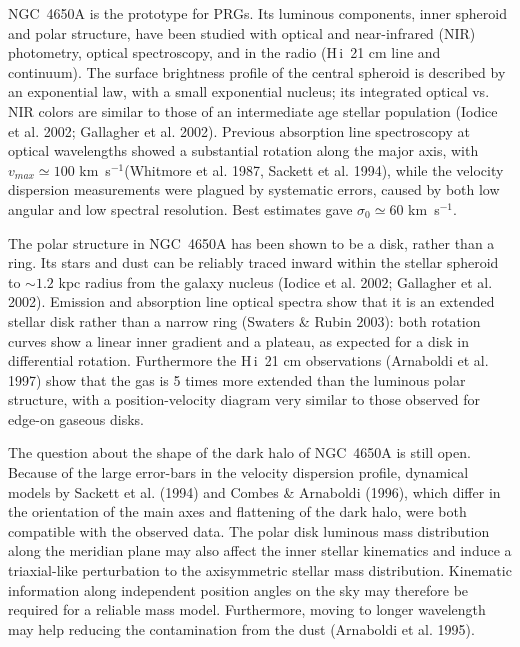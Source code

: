 \documentclass[12pt,preprint]{aastex}
\newcommand{\HI}{\mbox{H\,{\sc i}}}
\newcommand{\kms}{\mbox{km~s$^{-1}$}}
\begin{document}
NGC~4650A is the prototype for PRGs. Its luminous components, inner
spheroid and polar structure, have been studied with optical and
near-infrared (NIR) photometry, optical spectroscopy, and in the radio
(\HI\ 21 cm line and continuum).  The surface brightness profile of
the central spheroid is described by an exponential law, with a small
exponential nucleus; its integrated optical vs. NIR colors are similar
to those of an intermediate age stellar population (Iodice et
al. 2002; Gallagher et al. 2002). Previous absorption line spectroscopy
at optical wavelengths showed a substantial rotation along the major
axis, with $v_{max} \simeq 100$ \kms (Whitmore et al. 1987, Sackett et
al. 1994), while the velocity dispersion measurements were plagued by
systematic errors, caused by both low angular and low spectral
resolution. Best estimates gave $\sigma_0 \simeq 60$ \kms.

The polar structure in NGC~4650A has been shown to be a disk, rather
than a ring. Its stars and dust can be reliably traced inward within
the stellar spheroid to $\sim 1.2$ kpc radius from the galaxy nucleus
(Iodice et al. 2002; Gallagher et al. 2002). Emission and absorption
line optical spectra show that it is an extended stellar disk rather
than a narrow ring (Swaters \& Rubin 2003): both rotation curves show
a linear inner gradient and a plateau, as expected for a disk in
differential rotation. Furthermore the \HI\ 21 cm observations
(Arnaboldi et al. 1997) show that the gas is 5 times more extended
than the luminous polar structure, with a position-velocity diagram
very similar to those observed for edge-on gaseous disks.

The question about the shape of the dark halo of NGC~4650A is still
open. Because of the large error-bars in the velocity dispersion
profile, dynamical models by Sackett et al. (1994) and Combes \&
Arnaboldi (1996), which differ in the orientation of the main axes and
flattening of the dark halo, were both compatible with the observed
data. The polar disk luminous mass distribution along the meridian
plane may also affect the inner stellar kinematics and induce a
triaxial-like perturbation to the axisymmetric stellar mass
distribution. Kinematic information along independent position angles
on the sky may therefore be required for a reliable mass
model. Furthermore, moving to longer wavelength may help reducing the
contamination from the dust (Arnaboldi et al. 1995).
\end{document}
